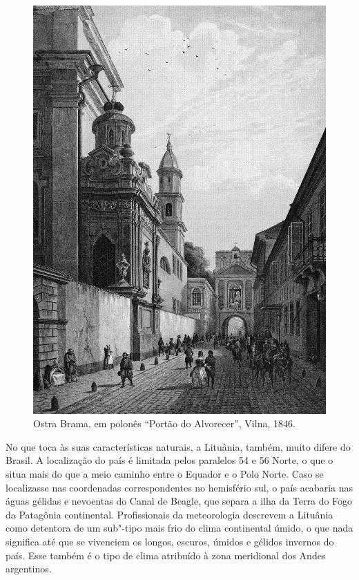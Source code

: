 \begin{figure}[!h]
    \centering
    \includegraphics[width=\textwidth]{ilustra-02.png}
    \caption{Ostra Brama, em polonês ``Portão do Alvorecer'', Vilna, 1846.}
\end{figure}

No que toca às suas características naturais, a Lituânia, também, muito
difere do Brasil. A localização do país é limitada pelos paralelos 54 e
56 Norte, o que o situa mais do que a meio caminho entre o Equador e o
Polo Norte. Caso se localizasse nas coordenadas correspondentes no
hemisfério sul, o país acabaria nas águas gélidas e nevoentas do Canal
de Beagle, que separa a ilha da Terra do Fogo da Patagônia continental.
Profissionais da meteorologia descrevem a Lituânia como detentora de um
sub"-tipo mais frio do clima continental úmido, o que nada significa até
que se vivenciem os longos, escuros, úmidos e gélidos invernos do país.
Esse também é o tipo de clima atribuído à zona meridional dos Andes
argentinos. 

